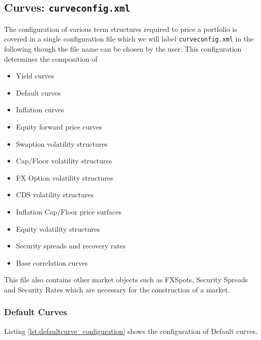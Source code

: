 \documentclass[12pt, a4paper]{article}
\begin{document}
\subsection{Curves: {\tt curveconfig.xml}}\label{sec:curveconfig}


The configuration of various term structures required to price a portfolio is covered in a single configuration file
which we will label {\tt curveconfig.xml} in the following though the file name can be chosen by the user. This
configuration determines the composition of 
\begin{itemize}
\item Yield curves %
\item Default curves %
\item Inflation curves %
\item Equity forward price curves %
\item Swaption volatility structures %
\item Cap/Floor volatility structures %
\item FX Option volatility structures %
\item CDS volatility structures
\item Inflation Cap/Floor price surfaces %
\item Equity volatility structures %
\item Security spreads and recovery rates %
\item Base correlation curves
\end{itemize}

This file also contains other market objects such as FXSpots, Security Spreads and Security Rates which are necessary
for the construction of a market.
 


\subsubsection{Default Curves}

Listing \ref{lst:defaultcurve_configuration} shows the configuration of Default curves.
\end{document}
